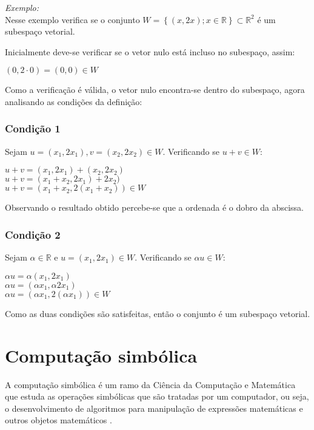\textit{Exemplo:}\\
Nesse exemplo verifica se o conjunto $W = \left \{ (x, 2x) ; x \in \mathbb{R} \right \} \subset \mathbb{R}^2$ é um subespaço vetorial.

Inicialmente deve-se verificar se o vetor nulo está incluso no subespaço, assim:
\begin{center}
    $(0, 2\cdot0) = (0,0) \in W$    
\end{center}
Como a verificação é válida, o vetor nulo encontra-se dentro do subespaço, agora analisando as condições da definição:

\subsubsection{Condição 1}
\noindent Sejam $u = (x_{1}, 2x_{1}), v = (x_{2}, 2x_{2}) \in W$. Verificando se $u + v \in W$:
\begin{center}
    $u + v = (x_{1}, 2x_{1}) + (x_{2}, 2x_{2})$\\
    $u + v = (x_{1} + x_{2}, 2x_{1}) + 2x_{2})$\\
    $u + v = (x_{1} + x_{2}, 2(x_{1} + x_{2})) \in W$\\
\end{center}
Observando o resultado obtido percebe-se que a ordenada é o dobro da abscissa.

\subsubsection{Condição 2}
\noindent Sejam $\alpha \in \mathbb{R}$ e $u = (x_{1}, 2x_{1}) \in W$. Verificando se $\alpha u \in W$:
\begin{center}
    $\alpha u = \alpha(x_{1}, 2x_{1})$\\
    $\alpha u = (\alpha x_{1}, \alpha 2x_{1})$\\
    $\alpha u = (\alpha x_{1}, 2(\alpha x_{1})) \in W$\\
\end{center}
Como as duas condições são satisfeitas, então o conjunto é um subespaço vetorial.


\section{Computação simbólica}
\label{computacao_simbolica}
\noindent A computação simbólica é um ramo da Ciência da Computação e Matemática que estuda as operações simbólicas que são tratadas por um computador, ou seja, o desenvolvimento de algoritmos para manipulação de expressões matemáticas e outros objetos matemáticos \cite{2005:Leandro}.

